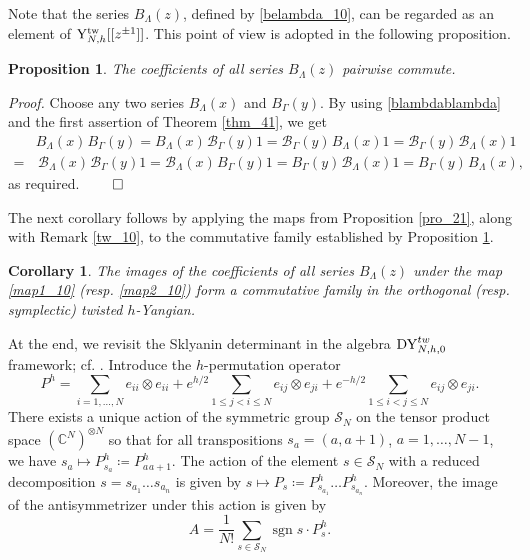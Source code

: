 \documentclass[12pt,a4paper,reqno]{amsart}
\theoremstyle{stil}
\theoremstyle{defi}
\theoremstyle{defi}
\theoremstyle{stil}
\newtheorem{pro}[thm]{Proposition}
\theoremstyle{stil}
\theoremstyle{stil}
\newtheorem{kor}[thm]{Corollary}
\theoremstyle{prim}
\newenvironment{prf}{\noindent \textit{Proof.}}{\null\hfill$\qed$\hskip
2mm\vskip 2mm}
\newcommand{\ot}{\otimes}
\newcommand{\ts}{\hspace{1pt}}
\newcommand{\yhg}{{\rm Y}_{N,h}^{\text{tw}} }
\newcommand{\dyhoz}{{\rm DY}_{N,h,0}^{tw}  }
\newcommand{\CC}{\mathbb{C}}
\begin{document}
Note that the series
 $B_\Lambda(z)$, defined by  \eqref{belambda_10}, can be regarded as an element of $\yhg[[z^{\pm 1}]]$. This  point of view is adopted in the following proposition.

\begin{pro}\label{Prop4455}
The coefficients of all series  $B_\Lambda(z)$ pairwise commute.
\end{pro}

\begin{prf}
Choose any two   series $B_\Lambda(x)$ and $B_\Gamma(y)$. By using \eqref{blambdablambda} and the first assertion of Theorem \ref{thm_41},  we get
\begin{align*}
&B_\Lambda(x)\ts B_\Gamma(y)
= B_\Lambda(x)\ts \mathcal{B}_\Gamma(y)  1
= \mathcal{B}_\Gamma(y)\ts B_\Lambda(x)   1
= \mathcal{B}_\Gamma(y)\ts \mathcal{B}_\Lambda(x)   1\\
= &\,\mathcal{B}_\Lambda(x)\ts\mathcal{B}_\Gamma(y)    1
= \mathcal{B}_\Lambda(x)\ts B_\Gamma(y)    1
=  B_\Gamma(y)\ts \mathcal{B}_\Lambda(x)   1
=  B_\Gamma(y)\ts B_\Lambda(x),
\end{align*}
as required.
\end{prf}

The next corollary follows by applying the maps from Proposition \ref{pro_21}, along with Remark \ref{tw_10}, to the commutative family established by Proposition \ref{Prop4455}.

\begin{kor}
The images of the coefficients of all series $B_\Lambda(z)$ under the map \eqref{map1_10} (resp. \eqref{map2_10}) form a commutative family in the orthogonal (resp.
symplectic) twisted $h$-Yangian. 
\end{kor}


 
At the end, we revisit the  Sklyanin determinant in the  algebra $\dyhoz$ framework; cf. \cite{MRS,Skly}. Introduce the $h$-permutation operator
$$
P^h=\sum_{i=1,\ldots ,N} e_{ii}\ot e_{ii}
+e^{h/2}\sum_{1\leqslant j<i\leqslant N} e_{ij}\ot e_{ji}
+e^{-h/2}\sum_{1\leqslant i<j\leqslant N} e_{ij}\ot e_{ji}.
$$
There exists a unique action of the symmetric group $\mathcal{S}_N$  on the tensor product space $\left(\CC^N\right)^{\ot N}$ so that for all transpositions $s_a=(a,a+1)$, $a=1,\ldots ,N-1$, we have
$
s_a \mapsto P_{s_a}^h\coloneqq P_{a\ts a+1}^h.
$
The action of the element $s\in \mathcal{S}_N$ with a reduced decomposition
$s=s_{a_1}\ldots s_{a_n}$ is given by $s\mapsto P_s\coloneqq P_{s_{a_1}}^h\ldots P_{s_{a_n}}^h$.  Moreover, the image of the antisymmetrizer under this action is given by
$$
A =\frac{1}{N!}\sum_{s\in \mathcal{S}_N}\mathop{sgn} s \cdot P_s^h.
$$
\end{document}
